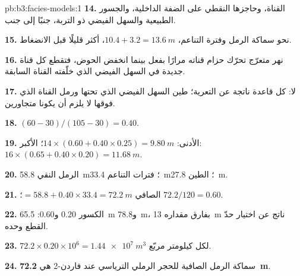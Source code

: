 \begin{solution}{pb:b3:facies-models:1}
\textbf{14.} القناة، وحاجزها النقطي على الضفة الداخلية، والجسور الطبيعية
والسهل الفيضي ذو التربة، جنبًا إلى جنب.

\textbf{15.} نحو سماكة الرمل وفترة التناعم، $10.4 + 3.2 =
\qty{13.6}{m}$، أكثر قليلًا قبل الانضغاط.

\textbf{16.} نهر متعرّج تحرّك حزام قناته مرارًا بفعل
 بينما انخفض الحوض، فتقطع كل قناة جديدة في
السهل الفيضي الذي خلّفته القناة السابقة.

\textbf{17.} لا: كل قاعدة ناتجة عن التعرية؛ طين السهل الفيضي الذي تحتها ورمل
القناة الذي فوقها لا يلزم أن يكونا متجاورين.

\textbf{18.} $(60 - 30)/(105 - 30) = 0.40$.

\textbf{19.} الأدنى: $14\times(0.60 + 0.40\times0.25) = \qty{9.80}{m}$؛
الأكبر: $16\times(0.65 + 0.40\times0.20) = \qty{11.68}{m}$.

\textbf{20.} الرمل النقي \qty{58.8}{m}؛ فترات التناعم \qty{33.4}{m}؛ الطين
\qty{27.8}{m}.

\textbf{21.} الصافي $= 58.8 + 0.40\times33.4 = \qty{72.2}{m}$؛ 
$72.2/120 = 0.60$.

\textbf{22.} الكسور 0.20 و0.60: \qty{65.5}{m} و\qty{78.8}{m}، بفارق
مقداره \qty{13}{m} ناتج عن اختيار حدّ القطع وحده.

\textbf{23.} $72.2\times0.20\times10^6 = \qty{1.44e7}{m^3}$ لكل
كيلومتر مربّع.

\textbf{24.} سماكة الرمل الصافية للحجر الرملي الترياسي عند فاردن-2 هي
\textbf{\qty[text-series-to-math=true]{72.2}{m}}.
\end{solution}
